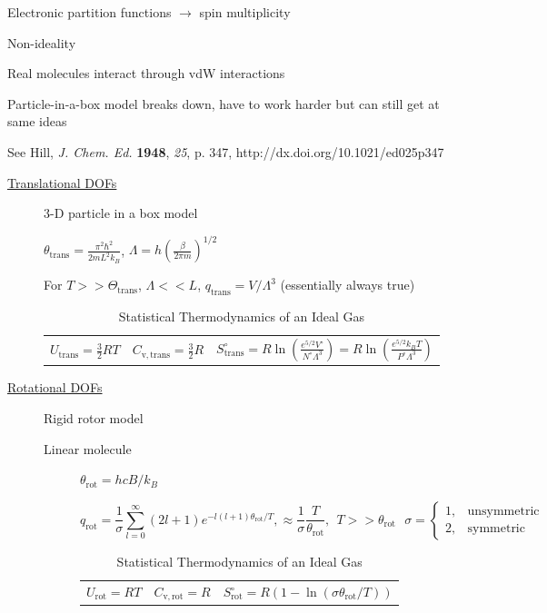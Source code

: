 \documentclass[11pt]{article}
\begin{document}
\begin{outline}
\begin{outline}
      \item Electronic partition functions $\rightarrow$ spin multiplicity
      \item Non-ideality
        \begin{outline}
          \item Real molecules interact through vdW interactions
          \item Particle-in-a-box model breaks down, have to work harder but
            can still get at same ideas
          \item See Hill, {\em J. Chem. Ed.} {\bf 1948}, {\em 25}, p. 347, http://dx.doi.org/10.1021/ed025p347
        \end{outline}
      \end{outline}

\begin{table} 
\begin{center}
    \caption{\large{Statistical Thermodynamics of an Ideal Gas}}
   \begin{description}
    \item[\underline{Translational DOFs}] {3-D particle in a box model}

$\displaystyle \theta_\mathrm{trans}= \frac{\pi^2\hbar^2}{2 m
  L^2 k_B}$, 
$\displaystyle \Lambda=h\left( \frac{\beta}{2\pi m}\right )^{1/2}$

For $ T >> \Theta_\mathrm{trans}$, $\Lambda << L$, $\displaystyle
q_\mathrm{trans}=V/\Lambda^3$ (essentially always true)

\begin{tabular}{ccc}
$\displaystyle U_\mathrm{trans}=\frac{3}{2}RT$ & $\displaystyle C_\mathrm{v,trans} =
\frac{3}{2}R $ & $\displaystyle S^\circ_\mathrm{trans}=R \ln \left (
  \frac{e^{5/2}V^\circ}{N^\circ \Lambda^3}\right ) = R \ln \left (
  \frac{e^{5/2}k_BT}{P^\circ \Lambda^3}\right ) $ \\
\end{tabular}

  \item[\underline{Rotational DOFs}] {Rigid rotor model}
\begin{description}
\item[Linear molecule]{}
$\theta_\mathrm{rot} =hcB/k_B$

\begin{equation*}
q_\mathrm{rot}=\frac{1}{\sigma}\sum_{l=0}^\infty (2l+1)e^{-l(l+1)\theta_\mathrm{rot}/T},  
\approx \frac{1}{\sigma}\frac{T}{\theta_\mathrm{rot}},\ \ T>>\theta_\mathrm{rot}\ \ \ \sigma = \left \{
        \begin{array}{rl}
          1, & \text{unsymmetric} \\
          2, & \text{symmetric}
        \end{array} \right . 
\end{equation*}
\begin{tabular}{ccc}
$\displaystyle U_\mathrm{rot}=RT$ & $\displaystyle C_\mathrm{v,rot} =
R $ & $\displaystyle S^\circ_\mathrm{rot}=R (1-\ln(\sigma\theta_\mathrm{rot}/T)) $ \\
\end{tabular}


\end{description}
\end{description}
\end{center}
\end{table}
\end{outline}
\end{document}

